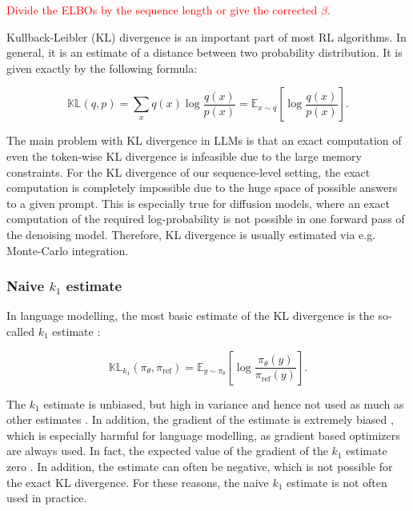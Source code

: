 \textcolor{red}{Divide the ELBOs by the sequence length or give the corrected $\beta$.}

Kullback-Leibler (KL) divergence is an important part of most RL algorithms. In general, it is an estimate of a distance between two probability distribution. It is given exactly by the following formula:

\begin{equation*}
    \mathbb{KL}(q, p) = \sum_{x}q(x)\log\frac{q(x)}{p(x)} = \mathbb{E}_{x\sim q}\left[\log\frac{q(x)}{p(x)}\right].
\end{equation*}

The main problem with KL divergence in LLMs is that an exact computation of even the token-wise KL divergence is infeasible due to the large memory constraints. For the KL divergence of our sequence-level setting, the exact computation is completely impossible due to the huge space of possible answers to a given prompt. This is especially true for diffusion models, where an exact computation of the required log-probability is not possible in one forward pass of the denoising model. Therefore, KL divergence is usually estimated via e.g. Monte-Carlo integration.


\subsubsection{Naive $k_1$ estimate}

In language modelling, the most basic estimate of the KL divergence is the so-called $k_1$ estimate \cite{schulman2020klblog}:

\begin{equation*}
    \mathbb{KL}_{k_1}(\pi_\theta, \pi_\text{ref}) = \mathbb{E}_{y\sim \pi_\theta}\left[\log\frac{\pi_\theta(y)}{\pi_\text{ref}(y)}\right].
\end{equation*}

The $k_1$ estimate is unbiased, but high in variance and hence not used as much as other estimates \cite{schulman2020klblog}. In addition, the gradient of the estimate is extremely biased \cite{tang2025pitfallskldivergencegradient}, which is especially harmful for language modelling, as gradient based optimizers are always used. In fact, the expected value of the gradient of the $k_1$ estimate zero \cite{tang2025pitfallskldivergencegradient}. In addition, the estimate can often be negative, which is not possible for the exact KL divergence. For these reasons, the naive $k_1$ estimate is not often used in practice.


